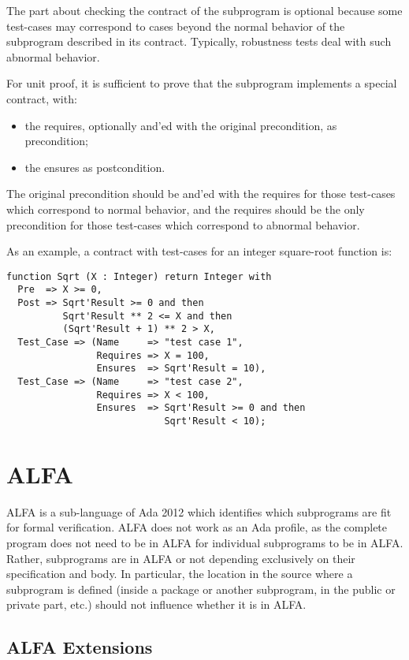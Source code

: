 \documentclass{article}
\begin{document}
The part about checking the contract of the subprogram is optional because some
test-cases may correspond to cases beyond the normal behavior of the subprogram
described in its contract. Typically, robustness tests deal with such abnormal
behavior.

For unit proof, it is sufficient to prove that the subprogram implements a
special contract, with:
\begin{itemize}
\item the requires, optionally and'ed with the original precondition, as
  precondition;
\item the ensures as postcondition.
\end{itemize}

The original precondition should be and'ed with the requires for those
test-cases which correspond to normal behavior, and the requires should be the
only precondition for those test-cases which correspond to abnormal behavior.

As an example, a contract with test-cases for an integer square-root function
is:

\begin{verbatim}
function Sqrt (X : Integer) return Integer with
  Pre  => X >= 0,
  Post => Sqrt'Result >= 0 and then
          Sqrt'Result ** 2 <= X and then
          (Sqrt'Result + 1) ** 2 > X,
  Test_Case => (Name     => "test case 1",
                Requires => X = 100, 
                Ensures  => Sqrt'Result = 10),
  Test_Case => (Name     => "test case 2",
                Requires => X < 100, 
                Ensures  => Sqrt'Result >= 0 and then 
                            Sqrt'Result < 10);
\end{verbatim}

\section{ALFA}

ALFA is a sub-language of Ada 2012 which identifies which subprograms are fit
for formal verification. ALFA does not work as an Ada profile, as the complete
program does not need to be in ALFA for individual subprograms to be in
ALFA. Rather, subprograms are in ALFA or not depending exclusively on their
specification and body. In particular, the location in the source where a
subprogram is defined (inside a package or another subprogram, in the public or
private part, etc.) should not influence whether it is in ALFA.

\subsection{ALFA Extensions}
\end{document}
